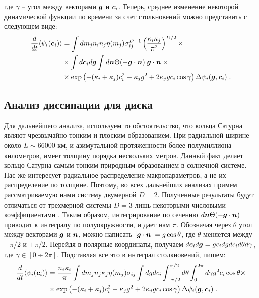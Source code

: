 где $\gamma$ -- угол между векторами $\bm{g}$ и $\bm{c}_i$. Теперь, среднее изменение некоторой динамической функции по времени
за счет столкновений можно представить с следующем виде:
\begin{equation}
  \begin{split}
    \frac{d}{dt}\langle\psi_i(\bm{c}_i)\rangle &= \int dm_jn_in_j\eta(m_j)
    \sigma^{D-1}_{ij}\left(\frac{\kappa_i\kappa_j}{\pi^2}\right)^{D/2}\times\\
    &\times\int d\bm{c}_id\bm{g}\int d\bm{n}\Theta(-\bm{g}\cdot\bm{n})\vert\bm{g}\cdot\bm{n}\vert\times\\
    &\times\exp\left(-(\kappa_i+\kappa_j)c^2_i-\kappa_jg^2+2\kappa_jgc_i\cos\gamma\right)\Delta\psi_i(\bm{g},\bm{c}_i)\;.
  \end{split}
\end{equation}


\subsection{Анализ диссипации для диска}
Для дальнейшего анализа, используем то обстоятельство, что кольца Сатурна являют чрезвычайно тонким и плоским образованием.
При радиальной ширине около $L\sim 66 000$ км, и азимутальной протяженности более полумиллиона километров, имеет толщину 
порядка нескольких метров. Данный факт делает кольцо Сатурна самым тонким природным образованием в солнечной системе. 
Нас же интересует радиальное распределение макропараметров, а не их распределение по толщине. Поэтому, во всех дальнейших
анализах примем рассматриваемую нами систему двумерной $D=2$. Полученные результаты будут отличаться от трехмерной системы
$D=3$ лишь некоторыми числовыми коэффициентами \cite{Garzo:2012pre_maxwell_gas,Geminard:2004pre_gran_pressure,Greenberg:1988icarus,
WisdomTremaine:1988astro,DeSoria:2013pre_hydro_gas}.
Таким образом, интегрирование по сечению $d\bm{n}\Theta(-\bm{g}\cdot\bm{n})$ приводит
к интегралу по полуокружности, и дает нам $\pi$. Обозначая через $\theta$ угол между векторами $\bm{g}$ и $\bm{n}$, можно написать
$\vert\bm{g}\cdot\bm{n}\vert=g\cos\theta$, где $\theta$ меняется между $-\pi/2$ и $+\pi/2$. Перейдя в полярные координаты, получаем
$d\bm{c}_id\bm{g}=gc_i dg dc_id\theta d\gamma$, где $\gamma\in[0\div 2\pi]$. Подставляя все это в интеграл столкновений, пишем:
\begin{equation}
  \begin{split}
    \frac{d}{dt}\langle\psi_i(\bm{c}_i)\rangle &=\frac{n_i\kappa_i}{\pi}\int dm_jn_j\kappa_j\eta(m_j)\sigma_{ij}
    \int dgdc_i\int_{-\pi/2}^{\pi/2}d\theta\int_0^{2\pi}d\gamma g^2c_i\cos\theta\times \\
    &\times\exp\left(-(\kappa_i+\kappa_j)c^2_i-\kappa_jg^2+2\kappa_jgc_i\cos\gamma\right)\Delta\psi_i(\bm{g},\bm{c}_i)\;.
  \end{split}
\end{equation}
